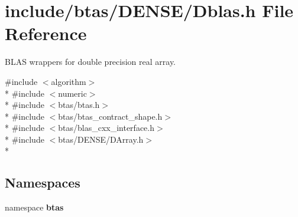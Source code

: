\section{include/btas/\-D\-E\-N\-S\-E/\-Dblas.h File Reference}
\label{de/d3a/Dblas_8h}


B\-L\-A\-S wrappers for double precision real array.  


{\ttfamily \#include $<$algorithm$>$}\\*
{\ttfamily \#include $<$numeric$>$}\\*
{\ttfamily \#include $<$btas/btas.\-h$>$}\\*
{\ttfamily \#include $<$btas/btas\-\_\-contract\-\_\-shape.\-h$>$}\\*
{\ttfamily \#include $<$btas/blas\-\_\-cxx\-\_\-interface.\-h$>$}\\*
{\ttfamily \#include $<$btas/\-D\-E\-N\-S\-E/\-D\-Array.\-h$>$}\\*
\subsection*{Namespaces}
\begin{DoxyCompactItemize}
\item 
namespace {\bf btas}
\end{DoxyCompactItemize}
